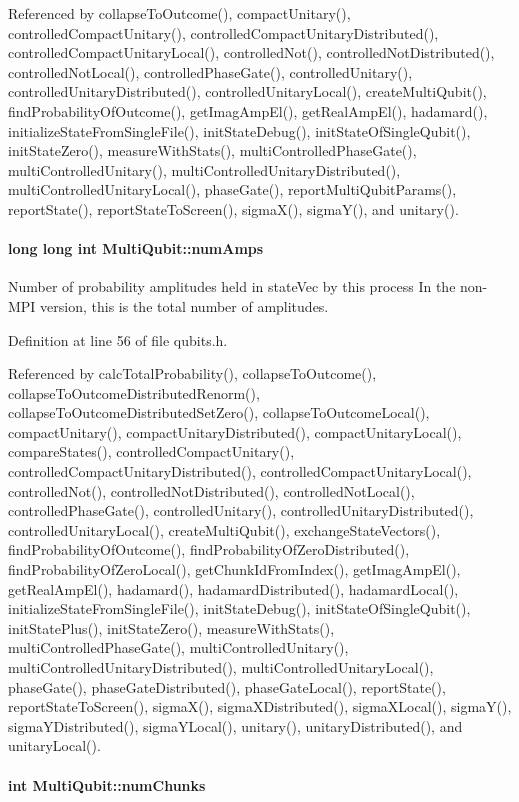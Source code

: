 Referenced by collapseToOutcome(), compactUnitary(), controlledCompactUnitary(), controlledCompactUnitaryDistributed(), controlledCompactUnitaryLocal(), controlledNot(), controlledNotDistributed(), controlledNotLocal(), controlledPhaseGate(), controlledUnitary(), controlledUnitaryDistributed(), controlledUnitaryLocal(), createMultiQubit(), findProbabilityOfOutcome(), getImagAmpEl(), getRealAmpEl(), hadamard(), initializeStateFromSingleFile(), initStateDebug(), initStateOfSingleQubit(), initStateZero(), measureWithStats(), multiControlledPhaseGate(), multiControlledUnitary(), multiControlledUnitaryDistributed(), multiControlledUnitaryLocal(), phaseGate(), reportMultiQubitParams(), reportState(), reportStateToScreen(), sigmaX(), sigmaY(), and unitary().\hypertarget{structMultiQubit_ae16f47d8b725c914fb7f66b6498d79db}{
\paragraph[{numAmps}]{\setlength{\rightskip}{0pt plus 5cm}long long int {\bf MultiQubit::numAmps}}\hfill}
\label{structMultiQubit_ae16f47d8b725c914fb7f66b6498d79db}


Number of probability amplitudes held in stateVec by this process In the non-\/MPI version, this is the total number of amplitudes. 

Definition at line 56 of file qubits.h.

Referenced by calcTotalProbability(), collapseToOutcome(), collapseToOutcomeDistributedRenorm(), collapseToOutcomeDistributedSetZero(), collapseToOutcomeLocal(), compactUnitary(), compactUnitaryDistributed(), compactUnitaryLocal(), compareStates(), controlledCompactUnitary(), controlledCompactUnitaryDistributed(), controlledCompactUnitaryLocal(), controlledNot(), controlledNotDistributed(), controlledNotLocal(), controlledPhaseGate(), controlledUnitary(), controlledUnitaryDistributed(), controlledUnitaryLocal(), createMultiQubit(), exchangeStateVectors(), findProbabilityOfOutcome(), findProbabilityOfZeroDistributed(), findProbabilityOfZeroLocal(), getChunkIdFromIndex(), getImagAmpEl(), getRealAmpEl(), hadamard(), hadamardDistributed(), hadamardLocal(), initializeStateFromSingleFile(), initStateDebug(), initStateOfSingleQubit(), initStatePlus(), initStateZero(), measureWithStats(), multiControlledPhaseGate(), multiControlledUnitary(), multiControlledUnitaryDistributed(), multiControlledUnitaryLocal(), phaseGate(), phaseGateDistributed(), phaseGateLocal(), reportState(), reportStateToScreen(), sigmaX(), sigmaXDistributed(), sigmaXLocal(), sigmaY(), sigmaYDistributed(), sigmaYLocal(), unitary(), unitaryDistributed(), and unitaryLocal().\hypertarget{structMultiQubit_acd43f2f57991709c9e94f73662c972b2}{
\paragraph[{numChunks}]{\setlength{\rightskip}{0pt plus 5cm}int {\bf MultiQubit::numChunks}}\hfill}
\label{structMultiQubit_acd43f2f57991709c9e94f73662c972b2}


